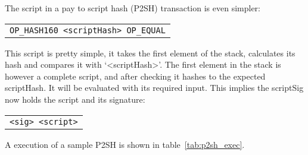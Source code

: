 The script in a pay to script hash (P2SH) transaction is even simpler:
\begin{center}
	\begin{tabular}{|c|}
		\texttt{OP\_HASH160 <scriptHash> OP\_EQUAL}
	\end{tabular}
\end{center}
This script is pretty simple, it takes the first element of the stack,
  calculates its hash and compares it with `<scriptHash>'. The first
  element in the stack is however a complete script, and after checking
  it hashes to the expected scriptHash. It will be evaluated with its
  required input. This implies the scriptSig now holds the script and
  its signature:

\begin{center}
	\begin{tabular}{|c|}
		\texttt{<sig> <script>}
	\end{tabular}
\end{center}


  A execution of a sample P2SH is shown in table~\ref{tab:p2sh_exec}.

